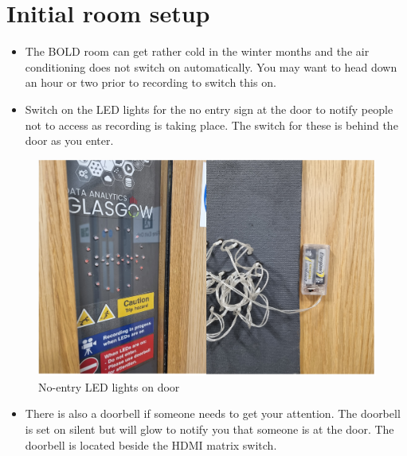 \documentclass[
]{book}
\providecommand{\tightlist}{%
  \setlength{\itemsep}{0pt}\setlength{\parskip}{0pt}}
\begin{document}
\hypertarget{initial-room-setup}{%
\section{Initial room setup}\label{initial-room-setup}}

\begin{itemize}
\item
  The BOLD room can get rather cold in the winter months and the air conditioning does not switch on automatically. You may want to head down an hour or two prior to recording to switch this on.
\item
  Switch on the LED lights for the no entry sign at the door to notify people not to access as recording is taking place. The switch for these is behind the door as you enter.
\end{itemize}

\begin{figure}

{\centering \includegraphics[width=1\linewidth]{Door_entrance} 

}

\caption{No-entry LED lights on door}\label{fig:door}
\end{figure}

\begin{itemize}
\tightlist
\item
  There is also a doorbell if someone needs to get your attention. The doorbell is set on silent but will glow to notify you that someone is at the door. The doorbell is located beside the HDMI matrix switch.
\end{itemize}
\end{document}
